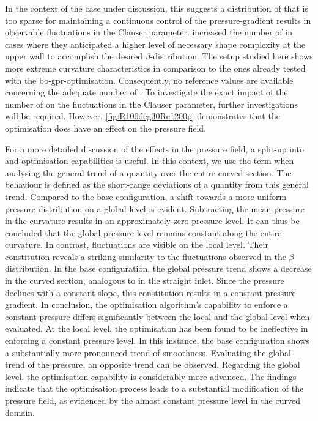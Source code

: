 In the context of the case under discussion, this suggests a distribution of  that is too sparse for maintaining a continuous control of the pressure-gradient results in observable fluctuations in the Clauser parameter.
\citet{morita_applying_2022} increased the number of  in cases where they anticipated a higher level of necessary shape complexity at the upper wall to accomplish the desired $\beta$-distribution.
The setup studied here shows more extreme curvature characteristics in comparison to the ones already tested with the \acrshort{bo}-\acrshort{gpr}-optimisation. 
Consequently, no reference values are available concerning the adequate number of .
To investigate the exact impact of the number of  on the fluctuations in the Clauser parameter, further investigations will be required.
However, \autoref{fig:R100deg30Re1200p} demonstrates that the optimisation does have an effect on the pressure field.

For a more detailed discussion of the effects in the pressure field, a split-up into  and  optimisation capabilities is useful.
In this context, we use the term  when analysing the general trend of a quantity over the entire curved section.
The  behaviour is defined as the short-range deviations of a quantity from this general trend.
Compared to the base configuration, a shift towards a more uniform pressure distribution on a global level is evident.
Subtracting the mean pressure in the curvature results in an approximately zero pressure level. 
It can thus be concluded that the global pressure level remains constant along the entire curvature.
In contrast, fluctuations are visible on the local level.
Their constitution reveals a striking similarity  to the fluctuations observed in the $\beta$ distribution.
In the base configuration, the global pressure trend shows a decrease in the curved section, analogous to in the straight inlet.
Since the pressure declines with a constant slope, this constitution results in a constant pressure gradient.
In conclusion, the optimisation algorithm's capability to enforce a constant pressure differs significantly between the local and the global level when evaluated.
At the local level, the optimisation has been found to be ineffective in enforcing a constant pressure level.
In this instance, the base configuration shows a substantially more pronounced trend of smoothness.
Evaluating the global trend of the pressure, an opposite trend can be observed.
Regarding the global level, the optimisation capability is considerably more advanced.
The findings indicate that the optimisation process leads to a substantial modification of the pressure field, as evidenced by the almost constant pressure level in the curved domain.


